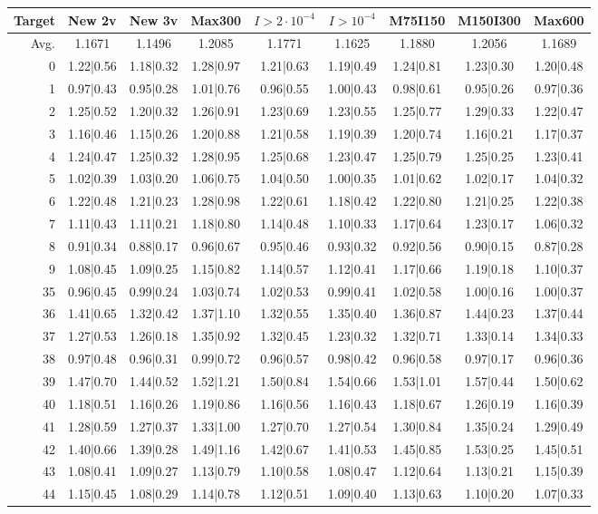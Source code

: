 \begin{table}
	\begin{tabular}{|r||c|c|c|c|c|c|c|c|}
\hline
Target & New 2v & New 3v & Max300 & $I>2\cdot10^{-4}$ & $I>10^{-4}$ & M75I150 & M150I300 & Max600  \\\hline
\hline
Avg. & 1.1671 & 1.1496 & 1.2085 & 1.1771 & 1.1625 & 1.1880 & 1.2056 & 1.1689  \\\hline
0 &1.22|0.56 &1.18|0.32 &1.28|0.97 &1.21|0.63 &1.19|0.49 &1.24|0.81 &1.23|0.30 &1.20|0.48  \\\hline
1 &0.97|0.43 &0.95|0.28 &1.01|0.76 &0.96|0.55 &1.00|0.43 &0.98|0.61 &0.95|0.26 &0.97|0.36  \\\hline
2 &1.25|0.52 &1.20|0.32 &1.26|0.91 &1.23|0.69 &1.23|0.55 &1.25|0.77 &1.29|0.33 &1.22|0.47  \\\hline
3 &1.16|0.46 &1.15|0.26 &1.20|0.88 &1.21|0.58 &1.19|0.39 &1.20|0.74 &1.16|0.21 &1.17|0.37  \\\hline
4 &1.24|0.47 &1.25|0.32 &1.28|0.95 &1.25|0.68 &1.23|0.47 &1.25|0.79 &1.25|0.25 &1.23|0.41  \\\hline
5 &1.02|0.39 &1.03|0.20 &1.06|0.75 &1.04|0.50 &1.00|0.35 &1.01|0.62 &1.02|0.17 &1.04|0.32  \\\hline
6 &1.22|0.48 &1.21|0.23 &1.28|0.98 &1.22|0.61 &1.18|0.42 &1.22|0.80 &1.21|0.25 &1.22|0.38  \\\hline
7 &1.11|0.43 &1.11|0.21 &1.18|0.80 &1.14|0.48 &1.10|0.33 &1.17|0.64 &1.23|0.17 &1.06|0.32  \\\hline
8 &0.91|0.34 &0.88|0.17 &0.96|0.67 &0.95|0.46 &0.93|0.32 &0.92|0.56 &0.90|0.15 &0.87|0.28  \\\hline
9 &1.08|0.45 &1.09|0.25 &1.15|0.82 &1.14|0.57 &1.12|0.41 &1.17|0.66 &1.19|0.18 &1.10|0.37  \\\hline
35 &0.96|0.45 &0.99|0.24 &1.03|0.74 &1.02|0.53 &0.99|0.41 &1.02|0.58 &1.00|0.16 &1.00|0.37  \\\hline
36 &1.41|0.65 &1.32|0.42 &1.37|1.10 &1.32|0.55 &1.35|0.40 &1.36|0.87 &1.44|0.23 &1.37|0.44  \\\hline
37 &1.27|0.53 &1.26|0.18 &1.35|0.92 &1.32|0.45 &1.23|0.32 &1.32|0.71 &1.33|0.14 &1.34|0.33  \\\hline
38 &0.97|0.48 &0.96|0.31 &0.99|0.72 &0.96|0.57 &0.98|0.42 &0.96|0.58 &0.97|0.17 &0.96|0.36  \\\hline
39 &1.47|0.70 &1.44|0.52 &1.52|1.21 &1.50|0.84 &1.54|0.66 &1.53|1.01 &1.57|0.44 &1.50|0.62  \\\hline
40 &1.18|0.51 &1.16|0.26 &1.19|0.86 &1.16|0.56 &1.16|0.43 &1.18|0.67 &1.26|0.19 &1.16|0.39  \\\hline
41 &1.28|0.59 &1.27|0.37 &1.33|1.00 &1.27|0.70 &1.27|0.54 &1.30|0.84 &1.35|0.24 &1.29|0.49  \\\hline
42 &1.40|0.66 &1.39|0.28 &1.49|1.16 &1.42|0.67 &1.41|0.53 &1.45|0.85 &1.53|0.25 &1.45|0.51  \\\hline
43 &1.08|0.41 &1.09|0.27 &1.13|0.79 &1.10|0.58 &1.08|0.47 &1.12|0.64 &1.13|0.21 &1.15|0.39  \\\hline
44 &1.15|0.45 &1.08|0.29 &1.14|0.78 &1.12|0.51 &1.09|0.40 &1.13|0.63 &1.10|0.20 &1.07|0.33  \\\hline
	\end{tabular}
\end{table}

